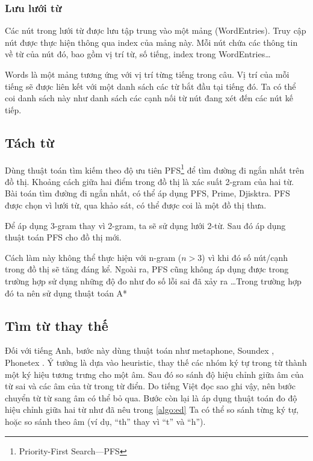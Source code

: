 \documentclass[a4paper,oneside]{book} %
\begin{document}


\subsubsection{Lưu lưới từ}

Các nút trong lưới từ được lưu tập trung vào một mảng
(WordEntries). Truy cập nút được thực hiện thông qua index của mảng
này. Mỗi nút chứa các thông tin về từ của nút đó, bao gồm vị trí từ,
số tiếng, index trong WordEntries\ldots{}

Words là một mảng tương ứng với vị trí từng tiếng trong câu. Vị trí
của mỗi tiếng sẽ được liên kết với một danh sách các từ bắt đầu tại
tiếng đó. Ta có thể coi danh sách này như danh sách các cạnh nối từ
nút đang xét đến các nút kế tiếp.


\subsection{Tách từ}
\label{sub:wordseg}

Dùng thuật toán tìm kiếm theo độ ưu tiên PFS\footnote{Priority-First
Search---PFS} để tìm đường đi ngắn nhất trên đồ thị. Khoảng cách giữa hai
điểm trong đồ thị là xác suất 2-gram của hai từ. Bài toán tìm đường
đi ngắn nhất, có thể áp dụng PFS, Prime, Djisktra. PFS được chọn vì
lưới từ, qua khảo sát, có thể được coi là một đồ thị thưa.

Để áp dụng 3-gram thay vì 2-gram, ta sẽ sử dụng lưới 2-từ. Sau đó áp
dụng thuật toán PFS cho đồ thị mới.

Cách làm này không thể thực hiện với n-gram ($n > 3$) vì khi đó số
nút/cạnh trong đồ thị sẽ tăng đáng kể. Ngoài ra, PFS cũng không áp
dụng được trong trường hợp sử dụng những độ đo như đo số lỗi sai đã
xảy ra \ldots Trong trường hợp đó ta nên sử dụng thuật toán A*\cite{Ravishankar}



\subsection{Tìm từ thay thế}

Đối với tiếng Anh, bước này dùng thuật toán như metaphone, Soundex
\cite{soundex}, Phonetex \cite{phonetex}. Ý tưởng 
là dựa vào heuristic, thay thế các nhóm ký tự trong từ thành một ký
hiệu tương trưng cho một âm. Sau đó so sánh độ hiệu chỉnh giữa âm của
từ sai và các âm của từ trong từ điển. Do tiếng Việt đọc sao ghi vậy,
nên bước chuyển từ từ sang âm có thể bỏ qua. Bước còn lại là áp dụng
thuật toán đo độ hiệu chỉnh giữa hai từ như đã nêu trong \ref{algo:ed}
Ta có thể so sánh từng ký tự, hoặc so sánh theo âm (ví dụ, ``th'' thay
vì ``t'' và ``h'').
\end{document}
